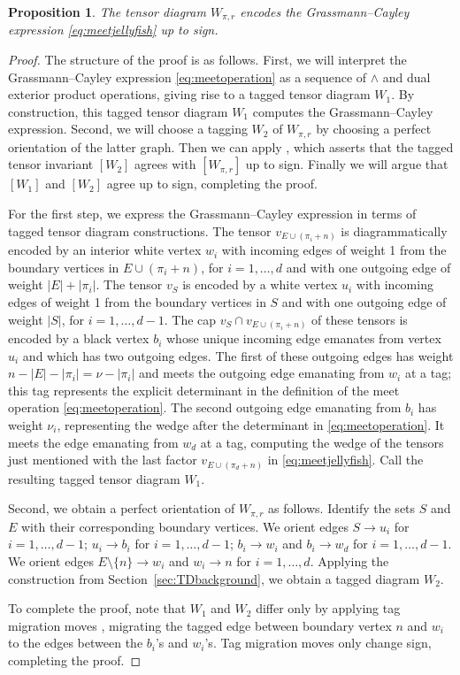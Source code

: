 \documentclass[10pt]{amsart}
\theoremstyle{definition}
\theoremstyle{plain}
\theoremstyle{plain}
\newtheorem{proposition}[cdrthm]{Proposition}
\theoremstyle{definition}
\theoremstyle{remark}
\theoremstyle{plain}
\theoremstyle{plain}
\theoremstyle{plain}
\numberwithin{equation}{section}
\begin{document}
\begin{proposition}\label{prop:webs_are_tensors}
The tensor diagram $W_{\pi,r}$ encodes the Grassmann--Cayley expression \eqref{eq:meetjellyfish} up to sign.
\end{proposition}

\begin{proof}
The structure of the proof is as follows. First, we will interpret the Grassmann--Cayley expression \eqref{eq:meetoperation} as a sequence of $\wedge$ and dual exterior product operations, giving rise to a tagged tensor diagram $W_1$. By construction, this tagged tensor diagram $W_1$ computes the Grassmann--Cayley expression. Second, we will choose a tagging $W_2$ of $W_{\pi,r}$ by choosing a perfect orientation of the latter graph. Then we can apply \cite[Lemma 5.4]{Fraser.Lam.Le}, which asserts that the tagged tensor invariant $[W_2]$ agrees with $[W_{\pi,r}]$ up to sign.  Finally we will argue that $[W_1]$ and $[W_2]$ agree up to sign, completing the proof. 

For the first step, we express the Grassmann--Cayley expression in terms of tagged tensor diagram constructions. The tensor $v_{E\cup (\pi_i+n)}$ is diagrammatically encoded by an interior white vertex $w_i$ with incoming edges of weight 1 from the boundary vertices in $E \cup (\pi_i+n)$, for $i=1,\dots,d$ and with one outgoing edge of weight $|E|+|\pi_i|$. The tensor $v_S$ is encoded by a white vertex $u_i$ with incoming edges of weight 1 from the boundary vertices in $S$ and with one outgoing edge of weight $|S|$, for $i=1,\dots,d-1$. The cap $v_S \cap v_{E\cup (\pi_i+n)}$ of these tensors is encoded by a black vertex $b_i$ whose unique incoming edge emanates from vertex $u_i$ and which has two outgoing edges. The first of these outgoing edges has weight $n-|E| - |\pi_i| = \nu-|\pi_i|$ and meets the outgoing edge emanating from $w_i$ at a tag; this tag represents the explicit determinant in the definition of the meet operation \eqref{eq:meetoperation}. The second outgoing edge emanating from $b_i$ has weight $\nu_i$, representing the wedge after the determinant in  \eqref{eq:meetoperation}. It meets the edge emanating from $w_d$ at a tag, computing the wedge of the tensors just mentioned with the last factor $v_{E \cup (\pi_d+n)}$ in \eqref{eq:meetjellyfish}. Call the resulting tagged tensor diagram $W_1$. 

Second, we obtain a perfect orientation of $W_{\pi,r}$ as follows. Identify the sets $S$ and $E$ with their corresponding boundary vertices. We orient edges $S \to u_i$ for $i=1,\dots,d-1$; $u_i \to b_i$ for $i=1,\dots,d-1$; $b_i \to w_i$ and $b_i \to w_d$ for $i=1,\dots,d-1$. We orient edges $E \setminus \{n\} \to w_i$ and $w_i \to n$ for $i=1,\dots,d$. Applying the construction from Section~\ref{sec:TDbackground}, we obtain a tagged diagram $W_2$. 

To complete the proof, note that $W_1$ and $W_2$ differ only by applying tag migration moves \cite[Equation 2.7]{Cautis.Kamnitzer.Morrison}, migrating the tagged edge between boundary vertex $n$ and $w_i$ to the edges between the $b_i$'s and $w_i$'s. Tag migration moves only change sign, completing the proof.
\end{proof}
\end{document}
